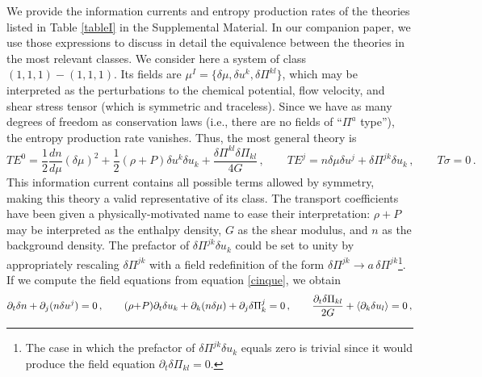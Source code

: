 \documentclass[aps,prl,singlecolumn,nofootinbib]{revtex4-2}
\theoremstyle{definition}
\theoremstyle{theorem}
\begin{document}
We provide the information currents and entropy production rates of the theories listed in Table \ref{tableI} in the Supplemental Material. In our companion paper, we use those expressions to discuss in detail the equivalence between the theories in the most relevant classes. We consider here
a system of class $(1,1,1)-(1,1,1)$. Its fields are $\mu^I=\{\delta \mu, \delta u^k,\delta \Pi^{kl} \}$, which may be interpreted as the perturbations to the chemical potential, flow velocity, and shear stress tensor (which is symmetric and traceless). Since we have as many degrees of freedom as conservation laws (i.e., there are no fields of ``$\Pi^a$ type''), the entropy production rate vanishes. Thus, the most general theory is
\begin{equation}\label{infoelas}
    TE^0 =\dfrac{1}{2}  \dfrac{d n}{d\mu} (\delta \mu)^2 + \dfrac{1}{2} (\rho {+} P)\delta u^k \delta u_k + \dfrac{\delta \Pi^{kl}\delta \Pi_{kl}}{4G} \, ,\qquad
    TE^j = n\delta \mu \delta u^j + \delta \Pi^{jk} \delta u_k \, ,\qquad
    T\sigma = 0 \,.
\end{equation}
This information current contains all possible terms allowed by symmetry, making this theory a valid representative of its class. The transport coefficients have been given a physically-motivated name to ease their interpretation: $\rho {+} P$ may be interpreted as the enthalpy density, $G$ as the shear modulus, and $n$ as the background density. The prefactor of $\delta \Pi^{jk} \delta u_k$ could be set to unity by appropriately rescaling $\delta \Pi^{jk}$ with a field redefinition of the form $\delta \Pi^{jk} \rightarrow a \, \delta \Pi^{jk}$\footnote{The case in which the prefactor of $\delta \Pi^{jk} \delta u_k$ equals zero is trivial since it would produce the field equation $\partial_t \delta \Pi_{kl}=0$.}. If we compute the field equations from equation \eqref{cinque}, we obtain
\begin{equation}\label{dayofrain}
     \partial_t \delta n + \partial_j (n \delta u^j)=0 \, , \qquad
     (\rho {+} P)\partial_t \delta u_k + \partial_k (n \delta \mu) + \partial_j \delta \Pi^j_k =0 \, , \qquad
     \dfrac{\partial_t \delta \Pi_{kl}}{2G} + \braket{\partial_k \delta u_l}=0 \, , 
\end{equation}
\end{document}
